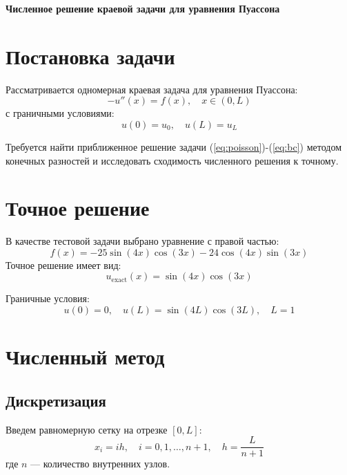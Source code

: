 \documentclass[a4paper,12pt]{article}
\begin{document}
	
	\begin{center}
		\Large\textbf{Численное решение краевой задачи для уравнения Пуассона} \\
	\end{center}
	
	\section*{Постановка задачи}
	
	Рассматривается одномерная краевая задача для уравнения Пуассона:
	\begin{equation}
		-u''(x) = f(x), \quad x \in (0, L)
		\label{eq:poisson}
	\end{equation}
	с граничными условиями:
	\begin{equation}
		u(0) = u_0, \quad u(L) = u_L
		\label{eq:bc}
	\end{equation}
	
	Требуется найти приближенное решение задачи (\ref{eq:poisson})-(\ref{eq:bc}) методом конечных разностей и исследовать сходимость численного решения к точному.
	
	\section*{Точное решение}
	
	В качестве тестовой задачи выбрано уравнение с правой частью:
	\begin{equation}
		f(x) = -25\sin(4x)\cos(3x) - 24\cos(4x)\sin(3x)
		\label{eq:f}
	\end{equation}
	Точное решение имеет вид:
	\begin{equation}
		u_{\text{exact}}(x) = \sin(4x)\cos(3x)
		\label{eq:exact}
	\end{equation}
	
	Граничные условия:
	\begin{equation}
		u(0) = 0, \quad u(L) = \sin(4L)\cos(3L), \quad L = 1
	\end{equation}
	
	\section*{Численный метод}
	
	\subsection*{Дискретизация}
	
	Введем равномерную сетку на отрезке $[0, L]$:
	\begin{equation}
		x_i = i h, \quad i = 0, 1, \dots, n+1, \quad h = \frac{L}{n+1}
	\end{equation}
	где $n$ — количество внутренних узлов.
	
\end{document}
